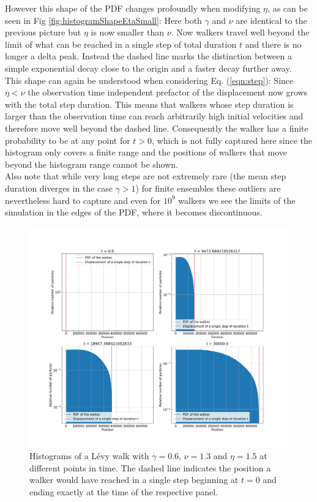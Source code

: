 However this shape of the \gls{PDF} changes profoundly when modifying $\eta$, as can be seen in Fig \ref{fig:histogramShapeEtaSmall}: Here both $\gamma$  and $\nu$ are identical to the previous picture but $\eta$ is now smaller than $\nu$. Now walkers travel well beyond the limit of what can be reached in a single step of total duration $t$ and there is no longer a  delta peak. Instead the dashed line marks the distinction between a simple exponential decay close to the origin and a faster decay further away. \\
This shape can again be understood when considering Eq. (\ref{eqn:step}): Since $\eta < \nu$ the observation time independent prefactor of the displacement now grows with the total step duration. This means that walkers whose step duration is larger than the observation time can reach arbitrarily high initial velocities and therefore move well beyond the dashed line. Consequently the walker has a finite probability to be at any point for $t>0$, which is not fully captured here since the histogram only covers a finite range and the positions of walkers that move beyond the histogram range cannot be shown. \\
Also note that while very long steps are not extremely rare (the mean step duration diverges in the case $\gamma >1$) for finite ensembles these outliers are nevertheless hard to capture and even for $10^{9}$ walkers we see the limits of the simulation in the edges of the \gls{PDF}, where it becomes discontinuous. 
%
\begin{figure}[!htb] %
\begin{center}
\includegraphics[width=1\textwidth]{pics/histogramShapeEtaLarge.png}
\caption{Histograms of a L\'evy walk with $\gamma =0.6$, $\nu = 1.3$ and $\eta =1.5$ at different points in time. The dashed line indicates the position a walker would have reached in a single step beginning at $t=0$ and ending exactly at the time of the respective panel.
\label{fig:histogramShapeEtaLarge} }
\end{center}
\end{figure} 

